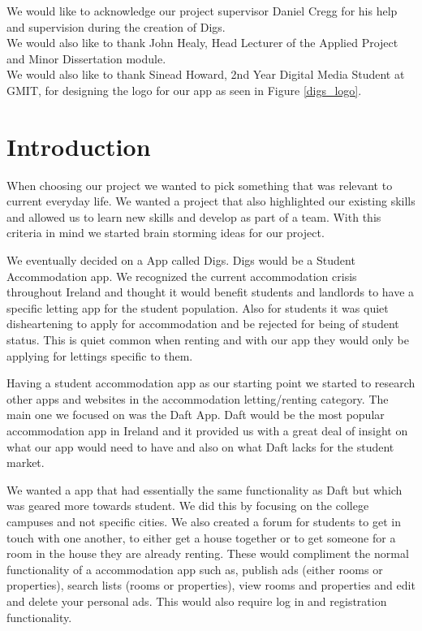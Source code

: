 \noindent We would like to acknowledge our project supervisor Daniel Cregg for his help and supervision during the creation of Digs.\\

\noindent We would also like to thank John Healy, Head Lecturer of the Applied Project and Minor Dissertation module. \\

\noindent We would also like to thank Sinead Howard, 2nd Year Digital Media Student at GMIT, for designing the logo for our app as seen in Figure \ref{digs_logo}.


\chapter{Introduction}

When choosing our project we wanted to pick something that was relevant to current everyday life. We wanted a project that also highlighted our existing skills and allowed us to learn new skills and develop as part of a team. With this criteria in mind we started brain storming ideas for our project.

We eventually decided on a App called Digs. Digs would be a Student Accommodation app. We recognized the current accommodation crisis throughout Ireland and thought it would benefit students and landlords to have a specific letting app for the student population. Also for students it was quiet disheartening to apply for accommodation and be rejected for being of student status. This is quiet common when renting and with our app they would only be applying for lettings specific to them.

Having a student accommodation app as our starting point we started to research other apps and websites in the accommodation letting/renting category. The main one we focused on was the Daft App\cite{Daft}. Daft would be the most popular accommodation app in Ireland and it provided us with a great deal of insight on what our app would need to have and also on what Daft lacks for the student market. 

We wanted a app that had essentially the same functionality as Daft but which was geared more towards student. We did this by focusing on the college campuses and not specific cities. We also created a forum for students to get in touch with one another, to either get a house together or to get someone for a room in the house they are already renting. These would compliment the normal functionality of a accommodation app such as, publish ads (either rooms or properties), search lists (rooms or properties), view rooms and properties and edit and delete your personal ads. This would also require log in and registration functionality.

